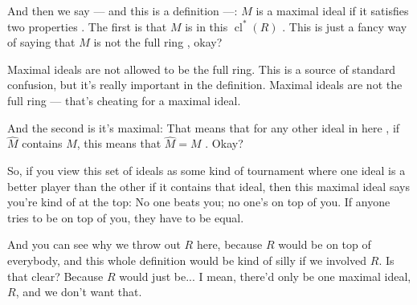 \begin{speech}[00:11:04 - 00:12:36]
And then we say --- and this is a definition ---: $M$ is a maximal ideal if it satisfies two properties . The first is that $M$ is in this $\operatorname{cl}^*(R)$ . This is just a fancy way of saying that $M$ is not the full ring , okay?

Maximal ideals are not allowed to be the full ring. This is a source of standard confusion, but it's really important in the definition. Maximal ideals are not the full ring --- that's cheating for a maximal ideal.

And the second is it's maximal: That means that for any other ideal in here , if $\hat{M}$ contains $M$, this means that $\hat{M} = M$ . Okay?

So, if you view this set of ideals as some kind of tournament where one ideal is a better player than the other if it contains that ideal, then this maximal ideal says you're kind of at the top: No one beats you; no one's on top of you. If anyone tries to be on top of you, they have to be equal.

And you can see why we throw out $R$ here, because $R$ would be on top of everybody, and this whole definition would be kind of silly if we involved $R$. Is that clear? Because $R$ would just be... I mean, there'd only be one maximal ideal, $R$, and we don't want that.
\end{speech}

\begin{content}

\end{content}

